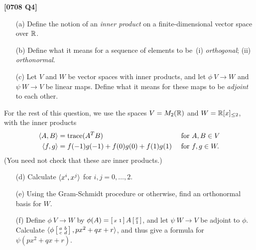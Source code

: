 \documentclass[a4paper]{article}
\begin{document}
\begin{problem}\textbf{[0708 Q4]}
 \begin{itemize}
  \item[(a)] Define the notion of an \emph{inner product} on a
   finite-dimensional vector space over ${\mathbb{R}}$. 
  \item[(b)] Define what it means for a sequence of elements to be~(i)
   \emph{orthogonal}; (ii) \emph{orthonormal}. 
  \item[(c)] Let $V$ and $W$ be vector spaces with inner products, and
   let $\phi\:V\to W$ and $\psi\:W\to V$ be linear maps.  Define what
   it means for these maps to be \emph{adjoint} to each other. 
 \end{itemize}
 For the rest of this question, we use the spaces $V=M_2({\mathbb{R}})$ and
 $W={\mathbb{R}}[x]_{\leq 2}$, with the inner products
 \begin{align*}
  \langle A,B\rangle &= \text{trace}(A^TB)
    & & \text{ for } A,B\in V\\
  \langle f,g\rangle &= f(-1)g(-1) + f(0)g(0) + f(1)g(1) 
    & & \text{ for } f,g\in W.
 \end{align*}
 (You need not check that these are inner products.)
 \begin{itemize}
  \item[(d)] Calculate $\langle x^i,x^j\rangle$ for $i,j=0,\dotsc,2$. 
  \item[(e)] Using the Gram-Schmidt procedure or otherwise, find an
   orthonormal basis for $W$. 
  \item[(f)] Define $\phi\:V\to W$ by 
   $\phi(A)=\left[\begin{smallmatrix} x& 1\end{smallmatrix}\right] A\left[\begin{smallmatrix} x\\1\end{smallmatrix}\right]$, and let $\psi\:W\to V$ be
   adjoint to $\phi$.  Calculate
   $\langle \phi\left[\begin{smallmatrix} a&b\\c&d\end{smallmatrix}\right],px^2+qx+r\rangle$, and thus give a formula for
   $\psi(px^2+qx+r)$.  
 \end{itemize}
\end{problem}
\end{document}

